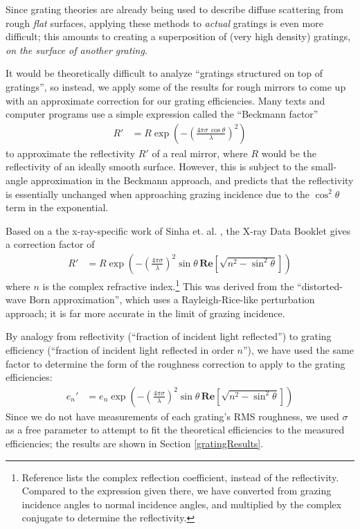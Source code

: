 Since grating theories are already being used to describe diffuse scattering from rough \emph{flat} surfaces, applying these methods to \emph{actual} gratings is even more difficult; this amounts to creating a superposition of (very high density) gratings, \emph{on the surface of another grating}.
 
 It would be theoretically difficult to analyze ``gratings structured on top of gratings'', so instead, we apply some of the results for rough mirrors to come up with an approximate correction for our grating efficiencies.  Many texts and computer programs use a simple expression called the ``Beckmann factor''
\begin{align}
\label{beckmannFactor}
R' &= R \exp\left(  - \left(\frac{4\pi\sigma \,  \cos \theta}{\lambda}\right)^2    \right)
\end{align}
to approximate the reflectivity $R'$ of a real mirror, where $R$ would be the reflectivity of an ideally smooth surface.  However, this is subject to the small-angle approximation in the Beckmann approach, and predicts that the reflectivity is essentially unchanged  when approaching grazing incidence due to the $\cos^2\theta$ term in the exponential. 
 
Based on a the x-ray-specific work of Sinha et. al. \cite{Sin88}, the X-ray Data Booklet \cite{Tho01} gives a correction factor of
\begin{align}
R' &= R \exp\left(  - \left(\frac{4\pi\sigma}{\lambda}\right)^2 \sin \theta \, \mathbf{Re}\left[ \sqrt{n^2 - \sin^2 \theta}  \right]    \right)
\end{align}
where $n$ is the complex refractive index.\footnote{Reference \cite{Tho01} lists the complex reflection coefficient, instead of the reflectivity.  Compared to the expression given there, we have converted from grazing incidence angles to normal incidence angles, and multiplied by the complex conjugate to determine the reflectivity.}  This was derived from the ``distorted-wave Born approximation'', which uses a Rayleigh-Rice-like perturbation approach; it is far more accurate in the limit of grazing incidence.

By analogy from reflectivity (``fraction of incident light reflected'') to grating efficiency (``fraction of incident light reflected in order $n$''), we have used the same factor to determine the form of the roughness correction to apply to the grating efficiencies:
\begin{align}
e_n' &= e_n \exp\left(  - \left(\frac{4\pi\sigma}{\lambda}\right)^2 \sin \theta \, \mathbf{Re}\left[ \sqrt{n^2 - \sin^2 \theta}  \right]    \right)
\label{roughnessCorrection}
\end{align}
Since we do not have measurements of each grating's RMS roughness, we used $\sigma$ as a free parameter to attempt to fit the theoretical efficiencies to the measured efficiencies; the results are shown in Section \ref{gratingResults}.

